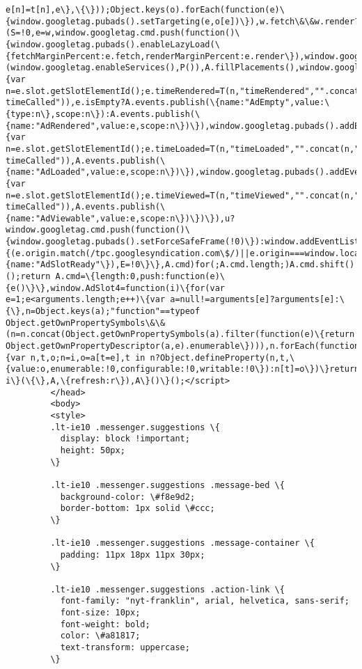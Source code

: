\documentclass[11pt]{article}
\begin{document}
\begin{Verbatim}[commandchars=\\\{\}]
e[n]=t[n],e\},\{\}));Object.keys(o).forEach(function(e)\{window.googletag.pubads().setTargeting(e,o[e])\}),w.fetch\&\&w.render?(S=!0,e=w,window.googletag.cmd.push(function()\{window.googletag.pubads().enableLazyLoad(\{fetchMarginPercent:e.fetch,renderMarginPercent:e.render\}),window.googletag.enableServices()\})):(window.googletag.enableServices(),P()),A.fillPlacements(),window.googletag.pubads().addEventListener("slotRenderEnded",function(e)\{var n=e.slot.getSlotElementId();e.timeRendered=T(n,"timeRendered","".concat(n,"-timeCalled")),e.isEmpty?A.events.publish(\{name:"AdEmpty",value:\{type:n\},scope:n\}):A.events.publish(\{name:"AdRendered",value:e,scope:n\})\}),window.googletag.pubads().addEventListener("slotOnload",function(e)\{var n=e.slot.getSlotElementId();e.timeLoaded=T(n,"timeLoaded","".concat(n,"-timeCalled")),A.events.publish(\{name:"AdLoaded",value:e,scope:n\})\}),window.googletag.pubads().addEventListener("impressionViewable",function(e)\{var n=e.slot.getSlotElementId();e.timeViewed=T(n,"timeViewed","".concat(n,"-timeCalled")),A.events.publish(\{name:"AdViewable",value:e,scope:n\})\})\}),u?window.googletag.cmd.push(function()\{window.googletag.pubads().setForceSafeFrame(!0)\}):window.addEventListener("message",function(e)\{(e.origin.match(/tpc.googlesyndication.com\$/)||e.origin===window.location.origin)\&\&O(e)\},!1),z(h),A.events.publish(\{name:"AdSlotReady"\}),E=!0\}\},A.cmd)for(;A.cmd.length;)A.cmd.shift()();return A.cmd=\{length:0,push:function(e)\{e()\}\},window.AdSlot4=function(i)\{for(var e=1;e<arguments.length;e++)\{var a=null!=arguments[e]?arguments[e]:\{\},n=Object.keys(a);"function"==typeof Object.getOwnPropertySymbols\&\&(n=n.concat(Object.getOwnPropertySymbols(a).filter(function(e)\{return Object.getOwnPropertyDescriptor(a,e).enumerable\}))),n.forEach(function(e)\{var n,t,o;n=i,o=a[t=e],t in n?Object.defineProperty(n,t,\{value:o,enumerable:!0,configurable:!0,writable:!0\}):n[t]=o\})\}return i\}(\{\},A,\{refresh:r\}),A\}()\}();</script>
         </head>
         <body>
         <style>
         .lt-ie10 .messenger.suggestions \{
           display: block !important;
           height: 50px;
         \}
         
         .lt-ie10 .messenger.suggestions .message-bed \{
           background-color: \#f8e9d2;
           border-bottom: 1px solid \#ccc;
         \}
         
         .lt-ie10 .messenger.suggestions .message-container \{
           padding: 11px 18px 11px 30px;
         \}
         
         .lt-ie10 .messenger.suggestions .action-link \{
           font-family: "nyt-franklin", arial, helvetica, sans-serif;
           font-size: 10px;
           font-weight: bold;
           color: \#a81817;
           text-transform: uppercase;
         \}
         

\end{Verbatim}
\end{document}

